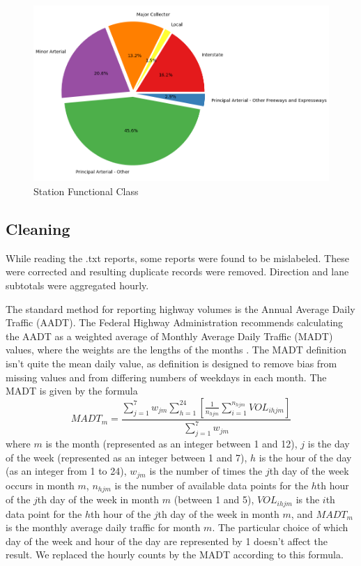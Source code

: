 \documentclass[9pt,twocolumn,twoside, lineno]{jost-new}
\numberwithin{subsection}{section}
\begin{document}
\begin{figure}[h!]
\centering
\includegraphics[width=\linewidth]{figures/functional_class_pie.png}
\caption{Station Functional Class}
\label{fig:functional_class_pie}
\end{figure}

\subsection{Cleaning}\label{subsec:cleaning}
While reading the .txt reports, some reports were found to be mislabeled.
These were corrected and resulting duplicate records were removed.
Direction and lane subtotals were aggregated hourly.

The standard method for reporting highway volumes is the Annual Average Daily Traffic (AADT).
The Federal Highway Administration recommends calculating the AADT as a weighted average of Monthly Average Daily Traffic (MADT) values, where the weights are the lengths of the months \cite{fhwa2}.
The MADT definition isn't quite the mean daily value, as definition is designed to remove bias from missing values and from differing numbers of weekdays in each month.
The MADT is given by the formula
\[
MADT_m = \frac{\sum_{j=1}^7 w_{jm} \sum_{h=1}^{24}\left[\frac{1}{n_{hjm}}\sum_{i=1}^{n_{hjm}}VOL_{ihjm}\right]}{\sum_{j=1}^7 w_{jm}}
\]
where $m$ is the month (represented as an integer between 1 and 12), $j$ is the day of the week (represented as an integer between 1 and 7), $h$ is the hour of the day (as an integer from 1 to 24), $w_{jm}$ is the number of times the $j$th day of the week occurs in month $m$, $n_{hjm}$ is the number of available data points for the $h$th hour of the $j$th day of the week in month $m$ (between 1 and 5), $VOL_{ihjm}$ is the $i$th data point for the $h$th hour of the $j$th day of the week in month $m$, and $MADT_m$ is the monthly average daily traffic for month $m$.
The particular choice of which day of the week and hour of the day are represented by 1 doesn't affect the result.
We replaced the hourly counts by the MADT according to this formula.
\end{document}

